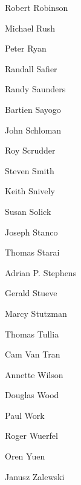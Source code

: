 \hspace*{52.55pt}%
\begin{minipage}[t]{90pt}
    \frontBallotNames
    Robert Robinson\par
    Michael Rush\par
    Peter Ryan\par
    Randall Safier\par
    Randy Saunders\par
    Bartien Sayogo\par
    John Schloman\par
    Roy Scrudder\par
    Steven Smith\par
    Keith Snively\par
    Susan Solick\par
    Joseph Stanco\par
    Thomas Starai\par
    Adrian P. Stephens\par
    Gerald Stueve\par
    Marcy Stutzman\par
    Thomas Tullia\par
    Cam Van Tran\par
    Annette Wilson\par
    Douglas Wood\par
    Paul Work\par
    Roger Wuerfel\par
    Oren Yuen\par
    Janusz Zalewski
\end{minipage}
\endgroup
\clearpage
